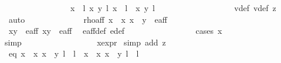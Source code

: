 \begin{isabellebody}
\ \ \ \ \ \ \ \ \ \ \ \ \ \ \ \ {\isacharbraceleft}{\isacharparenleft}{\isacharparenleft}{\isacharparenleft}x{\isacharcomma}\ {}{\isacharparenright}{\isacharcomma}\ l{\isacharparenright}{\isacharcomma}\ {\isacharparenleft}x{\isacharprime}{\isacharcomma}\ y{\isacharprime}{\isacharparenright}{\isacharcomma}\ l{\isacharprime}{\isacharparenright}{\isacharcomma}\ {\isacharparenleft}{\isacharparenleft}{\isacharparenleft}x{\isacharcomma}\ {}{\isacharparenright}{\isacharcomma}\ l{\isacharparenright}{\isacharcomma}\ {\isasymtau}\ {\isacharparenleft}x{\isacharprime}{\isacharcomma}\ y{\isacharprime}{\isacharparenright}{\isacharcomma}\ l{\isacharprime}\ {\isacharplus}\ {}{\isacharparenright}{\isacharbraceright}{\isachardoublequoteclose}\ \isanewline
\ \ \ \ \ \ \ \ \ \ \ \ \ \ \isamarkupfalse%
\ v{}{\isacharunderscore}def\ v{}{\isacharunderscore}def\ z{}\ \isamarkupfalse%
\ auto\isanewline
\ \ \ \ \ \ \ \ \ \ \ \ \isamarkupfalse%
\ rho{\isacharunderscore}aff{\isacharcolon}\ {\isachardoublequoteopen}{\isacharparenleft}x\ {\isacharasterisk}\ x{\isacharprime}{\isacharcomma}\ x\ {\isacharasterisk}\ y{\isacharprime}{\isacharparenright}\ {\isasymin}\ e{\isacharunderscore}aff{\isachardoublequoteclose}\isanewline
\ \ \ \ \ \ \ \ \ \ \ \ \ \ \ \ \isamarkupfalse%
\ {\isacartoucheopen}{\isacharparenleft}x{\isacharcomma}y{\isacharparenright}\ {\isasymin}\ e{\isacharunderscore}aff{\isacartoucheclose}\ {\isacartoucheopen}{\isacharparenleft}x{\isacharprime}{\isacharcomma}y{\isacharprime}{\isacharparenright}\ {\isasymin}\ e{\isacharunderscore}aff{\isacartoucheclose}\ \isamarkupfalse%
\ e{\isacharunderscore}aff{\isacharunderscore}def\ e{\isacharprime}{\isacharunderscore}def\isanewline
\ \ \ \ \ \ \ \ \ \ \ \ \ \ \ \ \isamarkupfalse%
{\isacharparenleft}cases\ {\isachardoublequoteopen}x\ {\isacharequal}\ {}{\isachardoublequoteclose}{\isacharparenright}\isanewline
\ \ \ \ \ \ \ \ \ \ \ \ \ \ \ \ \isamarkupfalse%
{\isacharparenleft}simp{\isacharparenright}\isanewline
\ \ \ \ \ \ \ \ \ \ \ \ \ \ \ \ \isamarkupfalse%
\ x{\isacharunderscore}expr\ \isamarkupfalse%
{\isacharparenleft}simp\ add{\isacharcolon}\ z{}{\isacharparenright}\isanewline
\ \ \ \ \ \ \ \ \ \ \ \ \isamarkupfalse%
\ eq{\isacharcolon}\ {\isachardoublequoteopen}{\isacharbraceleft}{\isacharparenleft}{\isacharparenleft}x\ {\isacharasterisk}\ x{\isacharprime}{\isacharcomma}\ x\ {\isacharasterisk}\ y{\isacharprime}{\isacharparenright}{\isacharcomma}\ l\ {\isacharplus}\ l{\isacharprime}{\isacharparenright}{\isacharcomma}\ {\isacharparenleft}{\isasymtau}\ {\isacharparenleft}x\ {\isacharasterisk}\ x{\isacharprime}{\isacharcomma}\ x\ {\isacharasterisk}\ y{\isacharprime}{\isacharparenright}{\isacharcomma}\ l\ {\isacharplus}\ l{\isacharprime}\ {\isacharplus}\ {}{\isacharparenright}{\isacharbraceright}\isanewline

\end{isabellebody}
